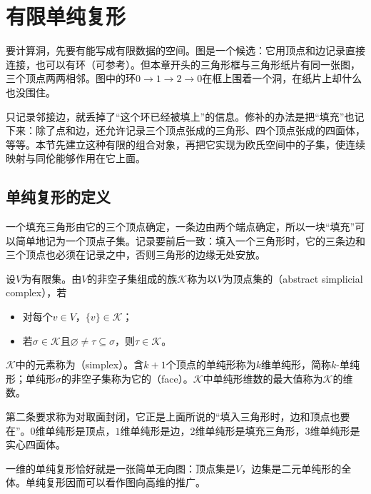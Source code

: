 \section{有限单纯复形}
\label{sec:homol-simplicial-complexes}

要计算洞，先要有能写成有限数据的空间。图是一个候选：它用顶点和边记录直接连接，也可以有环（可参考）。但本章开头的三角形框与三角形纸片有同一张图，三个顶点两两相邻。图中的环$0\to1\to2\to0$在框上围着一个洞，在纸片上却什么也没围住。

只记录邻接边，就丢掉了“这个环已经被填上”的信息。修补的办法是把“填充”也记下来：除了点和边，还允许记录三个顶点张成的三角形、四个顶点张成的四面体，等等。本节先建立这种有限的组合对象，再把它实现为欧氏空间中的子集，使连续映射与同伦能够作用在它上面。

\subsection{单纯复形的定义}
\label{sec:homol-complex-definition}

一个填充三角形由它的三个顶点确定，一条边由两个端点确定，所以一块“填充”可以简单地记为一个顶点子集。记录要前后一致：填入一个三角形时，它的三条边和三个顶点也必须在记录之中，否则三角形的边缘无处安放。

\begin{definition}[抽象单纯复形]
\label{def:homol-simplicial-complex}
设$V$为有限集。由$V$的非空子集组成的族$\mathcal K$称为以$V$为顶点集的（abstract simplicial complex），若
\begin{itemize}
 \item 对每个$v\in V$，$\{v\}\in\mathcal K$；
 \item 若$\sigma\in\mathcal K$且$\varnothing\neq\tau\subseteq\sigma$，则$\tau\in\mathcal K$。
\end{itemize}
$\mathcal K$中的元素称为（simplex）。含$k+1$个顶点的单纯形称为$k$维单纯形，简称$k$-单纯形；单纯形$\sigma$的非空子集称为它的（face）。$\mathcal K$中单纯形维数的最大值称为$\mathcal K$的维数。
\end{definition}

第二条要求称为对取面封闭，它正是上面所说的“填入三角形时，边和顶点也要在”。$0$维单纯形是顶点，$1$维单纯形是边，$2$维单纯形是填充三角形，$3$维单纯形是实心四面体。

一维的单纯复形恰好就是一张简单无向图：顶点集是$V$，边集是二元单纯形的全体。单纯复形因而可以看作图向高维的推广。

